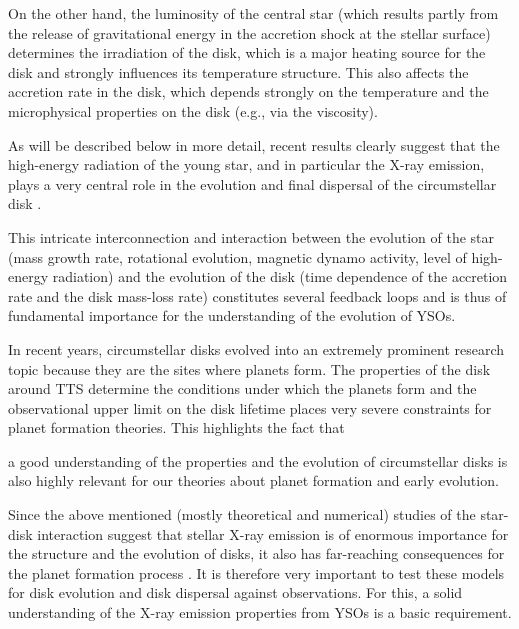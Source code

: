 \documentclass[10pt,fleqn,twoside,a4paper]{article}
\begin{document}
On the other hand, the
 luminosity of the central star (which results 
partly from the
release of gravitational energy in the accretion shock at the stellar surface) 
determines the irradiation of the disk,
which is a major heating source for the disk and strongly
influences its temperature structure. This also affects the accretion rate in the
disk, which depends strongly on the
 temperature and the
microphysical properties on the disk (e.g., via the viscosity).


As will be described below in more detail, recent results clearly suggest that the
high-energy radiation of the young star, and in particular the X-ray emission,
 plays a very central role in the evolution
and final dispersal of the circumstellar disk
\citep{Ercolano08a,Ercolano08b,Ercolano09,Owen10,Owen11,Owen12}.



%
This intricate interconnection and interaction between the evolution of the star 
(mass growth rate, rotational evolution, magnetic dynamo activity, level
of high-energy radiation)
and the evolution of the disk (time dependence of the accretion rate
and the disk mass-loss rate)
constitutes several feedback loops and is thus 
of fundamental importance for the understanding of the
evolution of YSOs.


\medskip

In recent years,
circumstellar disks evolved into an extremely prominent research topic 
because they are the sites where planets form. 
The properties of the disk around TTS determine the conditions 
under which the planets form and the observational upper limit on the
disk lifetime places very severe constraints for planet formation 
theories.
This highlights the fact that
\begin{highlight}
a good understanding of the properties and the evolution of circumstellar disks is also 
highly relevant for our theories about planet formation and early evolution.
\end{highlight}


Since the above mentioned (mostly theoretical and numerical) studies
of the star-disk interaction
suggest that stellar X-ray emission is of enormous 
importance for the structure and the evolution of disks, it also
has far-reaching consequences for the planet formation process
\citep{ER15,2013MNRAS.430.1392R, Rosotti15}.
%
It is therefore very important to test these models for disk evolution and disk dispersal
against observations.
For this, a solid understanding of the X-ray
emission properties from YSOs is a basic requirement.
\end{document}
